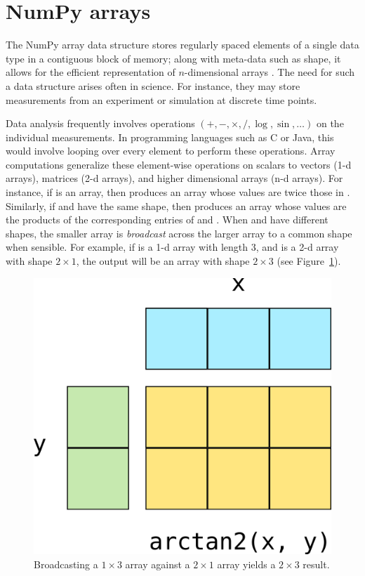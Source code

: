 \section*{NumPy arrays}

The NumPy array data structure stores regularly spaced elements of a single
data type in a contiguous block of memory; along with meta-data such as shape,
it allows for the efficient representation of $n$-dimensional arrays \cite{vanderwalt2011numpy}.
The need for such a data structure arises often in science.
For instance, they may store measurements from an experiment or simulation
at discrete time points.

Data analysis frequently involves operations $(+, -, \times, /, \log, \sin, \dots)$ on
the individual measurements.
In programming languages such as C or Java, this would involve looping over
every element to perform these operations.
Array computations generalize these element-wise operations on scalars to
vectors (1-d arrays), matrices (2-d arrays), and higher dimensional arrays (n-d
arrays).
For instance, if  is an array, then  produces
an array whose values are twice those in .
Similarly, if  and  have the same shape, then
 produces an array whose values are the products of
the corresponding entries of  and .
When  and  have different shapes, the smaller array is \emph{broadcast}
across the larger array to a common shape when sensible.
For example, if  is a 1-d array with length 3, and  is a 2-d
array with shape $2 \times 1$, the output will be an array with shape $2 \times 3$
(see Figure~\ref{fig:broadcasting}).

\begin{figure}
  \centering
  \includegraphics[width=0.5\linewidth]{static/broadcasting}
  \caption{
    Broadcasting a $1 \times 3$ array against a $2 \times 1$ array
    yields a $2 \times 3$ result.
  }
  \label{fig:broadcasting}
\end{figure}

